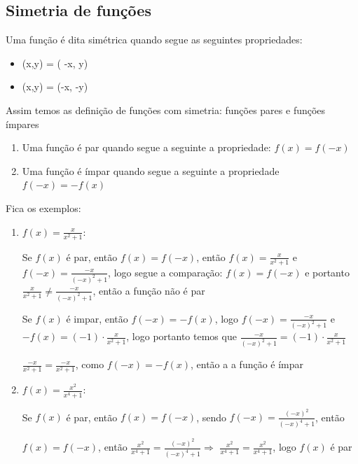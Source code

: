 \begin{multicols*}{2}
            \subsection*{Simetria de funções}
            Uma função é dita simétrica quando segue as seguintes propriedades:
            \begin{itemize}
            \item (x,y) = ( -x, y)
            \item (x,y) = (-x, -y)
            \end{itemize}
            Assim temos as definição de funções com simetria: funções pares e funções ímpares
            \begin{enumerate}
            \item Uma função é par quando segue a seguinte a propriedade: $f(x) = f(-x)$
            \item Uma função é ímpar quando segue a seguinte a propriedade $f(-x) = -f(x)$
            \end{enumerate}
            Fica os exemplos:
            \begin{enumerate}
            \item $	f(x) = \frac{x}{x^2 + 1} $:
            
            Se $f(x)$ é par, então $f(x) = f(-x)$, então $f(x) = \frac{x}{x^2 +1 }$ e 
            $f(-x) = \frac{-x}{(-x)^2 +1}$, logo segue a comparação: $f(x) = f(-x)$ e portanto 
            $\frac{x}{x^2 +1 } \ne \frac{ -x}{ (-x)^2 +1}$, então a função não é par
            
            Se $f(x)$ é impar, então $f(-x) = -f(x)$, logo $f(-x) = \frac{-x}{(-x)^2 +1}$ e 
            $-f(x) = (-1) \cdot \frac{x}{x^2 +1}$, logo portanto temos que 
            $\frac{-x}{(-x)^2 +1} = (-1) \cdot \frac{x}{x^2 +1} $
            
            $\frac{-x}{x^2 +1} = \frac{-x}{x^2 +1} $, como $f(-x) = -f(x)$, então a a função é 
            ímpar
            
            \item $f(x) = \frac{x^2}{x^4 +1}$:
            
            Se $f(x)$ é par, então $f(x) = f(-x)$, sendo $f(-x) = \frac{(-x)^2}{(-x)^4 + 1}$, então
            
            $f(x) = f(-x)$, então $ \frac{x^2}{x^4 +1} = \frac{(-x)^2}{(-x)^4 + 1} \Rightarrow$		
            $\frac{x^2}{x^4 +1} = \frac{x^2}{x^4 + 1}$, logo $f(x)$ é par
            
            \end{enumerate}
            

\end{multicols*}
